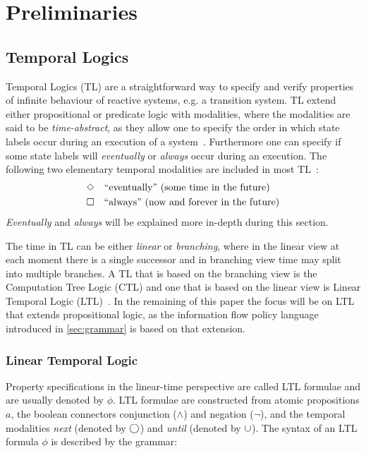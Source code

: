 \section{Preliminaries}\label{sec:preliminaries}
\subsection{Temporal Logics}
Temporal Logics (TL) are a straightforward way to specify and verify properties of infinite behaviour of reactive systems, e.g. a transition system. TL extend either propositional or predicate logic with modalities, where the modalities are said to be \emph{time-abstract}, as they allow one to specify the order in which state labels occur during an execution of a system~\cite{baier2008principles}. Furthermore one can specify if some state labels will \emph{eventually} or \emph{always} occur during an execution. The following two elementary temporal modalities are included in most TL~\cite{baier2008principles}:
\begin{align*}
    &\Diamond \quad \text{``eventually'' (some time in the future)}\\
    &\square \quad \text{``always'' (now and forever in the future)}
\end{align*}
\emph{Eventually} and \emph{always} will be explained more in-depth during this section. 

The time in TL can be either \emph{linear} or \emph{branching}, where in the linear view at each moment there is a single successor and in branching view time may split into multiple branches. A TL that is based on the branching view is the Computation Tree Logic (CTL) and one that is based on the linear view is Linear Temporal Logic (LTL)~\cite{baier2008principles}. In the remaining of this paper the focus will be on LTL that extends propositional logic, as the information flow policy language introduced in \autoref{sec:grammar} is based on that extension.

\subsubsection{Linear Temporal Logic}\label{sec:ltl}
Property specifications in the linear-time perspective are called LTL formulae and are usually denoted by $\phi$. LTL formulae are constructed from atomic propositions $a$, the boolean connectors conjunction ($\land$) and negation ($\lnot$), and the temporal modalities \emph{next} (denoted by $\bigcirc$) and \emph{until} (denoted by $\cup$). The syntax of an LTL formula $\phi$ is described by the grammar:

